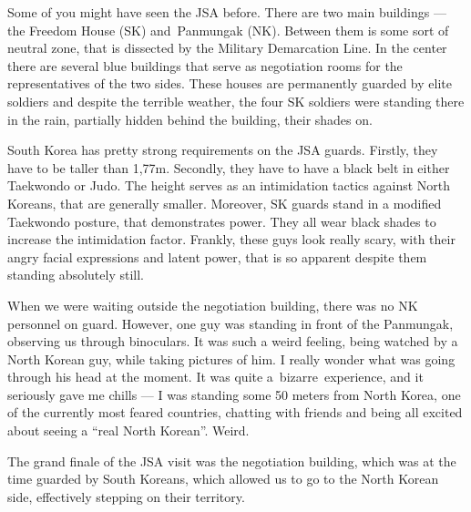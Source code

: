 \begin{post}
\begin{content}
Some of you might have seen the JSA before. There are two main buildings --- the Freedom House (SK) and Pan\-mun\-gak (NK). Between them is some sort of neutral zone, that is dissected by the Military Demarcation Line. In the center there are several blue buildings that serve as negotiation rooms for the representatives of the two sides. These houses are permanently guarded by elite soldiers and despite the terrible weather, the four SK soldiers were standing there in the rain, partially hidden behind the building, their shades on.

South Korea has pretty strong requirements on the JSA guards. Firstly, they have to be taller than 1,77m. Secondly, they have to have a black belt in either Taekwondo or Judo. The height serves as an intimidation tactics against North Koreans, that are generally smaller. Moreover, SK guards stand in a modified Taekwondo posture, that demonstrates power. They all wear black shades to increase the intimidation factor. Frankly, these guys look really scary, with their angry facial expressions and latent power, that is so apparent despite them standing absolutely still.

When we were waiting outside the negotiation building, there was no NK personnel on guard. However, one guy was standing in front of the Panmungak, observing us through binoculars. It was such a weird feeling, being watched by a North Korean guy, while taking pictures of him. I really wonder what was going through his head at the moment. It was quite a bizarre experience, and it seriously gave me chills --- I was standing some 50 meters from North Korea, one of the currently most feared countries, chatting with friends and being all excited about seeing a ``real North Korean''. Weird.


The grand finale of the JSA visit was the negotiation building, which was at the time guarded by South Koreans, which allowed us to go to the North Korean side, effectively stepping on their territory.



\end{content}
\end{post}
